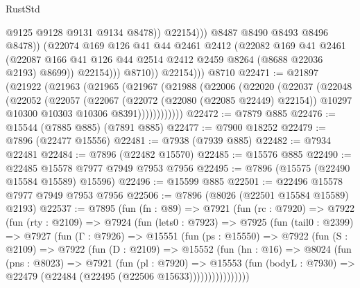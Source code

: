 \begin{lexlean}{RustStd}
\begin{coremodule}
                                @9125
                                @9128
                                @9131
                                @9134
                                @8478))
                            @22154)))
                      @8487
                      @8490
                      @8493
                      @8496
                      @8478))
                  (@22074
                    @169
                    @126
                    @41
                    @44
                    @2461
                    @2412
                    (@22082
                      @169
                      @41
                      @2461
                      (@22087 @166 @41 @126 @44 @2514 @2412 @2459 @8264 (@8688 @22036 @2193) @8699))
                    @22154)))
              @8710))
          @22154)))
    @8710
@22471 := @21897
    (@21922
      (@21963
        (@21965
          (@21967
            (@21988
              (@22006
                (@22020
                  (@22037
                    (@22048
                      (@22052
                        (@22057
                          (@22067
                            (@22072 (@22080 (@22085 @22449) @22154))
                            @10297
                            @10300
                            @10303
                            @10306
                            @8391))))))))))))
@22472 := @7879 @885
@22476 := @15544 (@7885 @885) (@7891 @885)
@22477 := @7900 @18252
@22479 := @7896 (@22477 @15556)
@22481 := @7938 (@7939 @885)
@22482 := @7934 @22481
@22484 := @7896 (@22482 @15570)
@22485 := @15576 @885
@22490 := @22485 @15578 @7977 @7949 @7953 @7956
@22495 := @7896 (@15575 (@22490 @15584 @15589) @15596)
@22496 := @15599 @885
@22501 := @22496 @15578 @7977 @7949 @7953 @7956
@22506 := @7896 (@8026 (@22501 @15584 @15589) @2193)
@22537 := @7895
    (fun (fn : @89) =>
    @7921
      (fun (rc : @7920) =>
      @7922
        (fun (rty : @2109) =>
        @7924
          (fun (lets0 : @7923) =>
          @7925
            (fun (tail0 : @2399) =>
            @7927
              (fun (Γ : @7926) =>
              @15551
                (fun (ps : @15550) =>
                @7922
                  (fun (S : @2109) =>
                  @7922
                    (fun (D : @2109) =>
                    @15552
                      (fun (hn : @16) =>
                      @8024
                        (fun (pns : @8023) =>
                        @7921
                          (fun (pl : @7920) =>
                          @15553
                            (fun (bodyL : @7930) =>
                            @22479 (@22484 (@22495 (@22506 @15633))))))))))))))))

\end{coremodule}
\end{lexlean}
